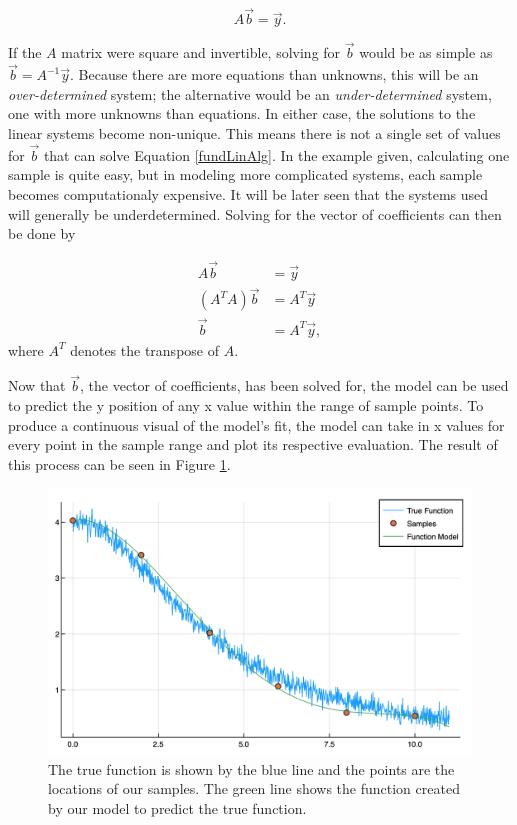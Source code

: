 \begin{equation} \label{fundLinAlg}
A\vec{b} = \vec{y}.
\end{equation}

\par If the $A$ matrix were square and invertible, solving for $\vec{b}$ would be as simple as $\vec{b} = A^{-1}\vec{y}$. Because there are more equations than unknowns, this will be an \textit{over-determined} system; the alternative would be an \textit{under-determined} system, one with more unknowns than equations. In either case, the solutions to the linear systems become non-unique. This means there is not a single set of values for $\vec{b}$ that can solve Equation \ref{fundLinAlg}. In the example given, calculating one sample is quite easy, but in modeling more complicated systems, each sample becomes computationaly expensive. It will be later seen that the systems used will generally be underdetermined. Solving for the vector of coefficients can then be done by 

\begin{align}
A\vec{b} &= \vec{y} \\
(A^TA)\vec{b} &= A^T\vec{y} \\
\vec{b} &= A^T\vec{y},
\end{align}
where $A^T$ denotes the transpose of $A$.

\par Now that $\vec{b}$, the vector of coefficients, has been solved for, the model can be used to predict the y position of any x value within the range of sample points. To produce a continuous visual of the model's fit, the model can take in x values for every point in the sample range and plot its respective evaluation. The result of this process can be seen in Figure \ref{figFunc1True}.

\begin{figure}[h]
\includegraphics[scale = 0.4]{Figures/func1True}
\caption{The true function is shown by the blue line and the points are the locations of our samples. The green line shows the function created by our model to predict the true function.
\label{figFunc1True}} 
\end{figure}



